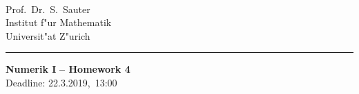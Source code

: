 \documentclass[11pt,a4paper,DIV9,german]{scrartcl}
\def\blnr{4}              %
\def\sdate{22.3.2019,}     %
\theoremstyle{break}   %
\begin{document}
\parbox{0ex}{    }   \\

\parbox{25ex}{
  Prof.~Dr.~S.~Sauter\\
  Institut f"ur Mathematik\\
  Universit"at Z"urich
  }
%
\rule[0cm]{0.cm}{.01cm}
\hfill  \parbox{0.6\textwidth}{
  {\sf\LARGE\bfseries Numerik I}
  {\sf\Large\bfseries \;\;--\;\; Homework \blnr }\\[1.5ex]
  Deadline: \sdate\ 13:00
  }



\vspace{10ex}




%
%
\end{document}
